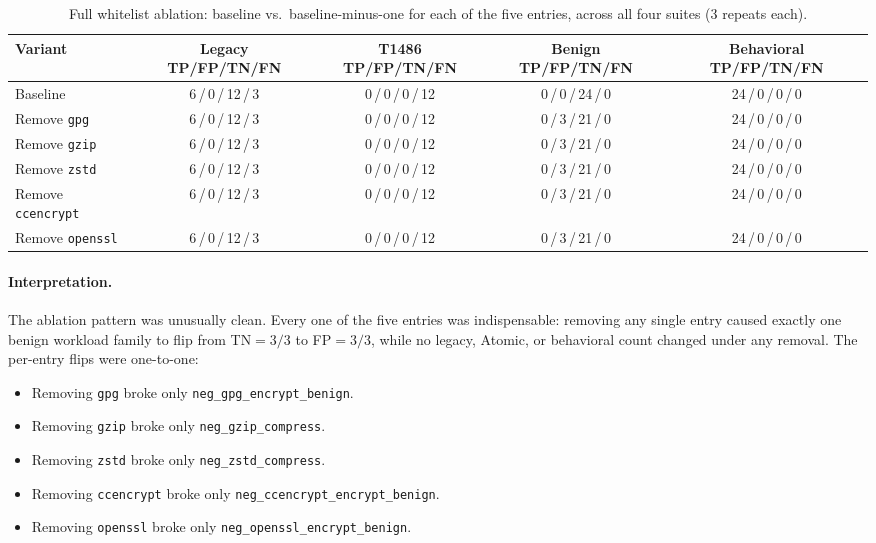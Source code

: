 \documentclass[twocolumn, 10pt]{scrartcl}
\begin{document}
\begin{table}[htbp]
    \centering
    \small
    \begin{tabular}{lcccc}
    \toprule
    \textbf{Variant} & \textbf{Legacy TP/FP/TN/FN} & \textbf{T1486 TP/FP/TN/FN} & \textbf{Benign TP/FP/TN/FN} & \textbf{Behavioral TP/FP/TN/FN} \\
    \midrule
    Baseline             & 6\,/\,0\,/\,12\,/\,3 & 0\,/\,0\,/\,0\,/\,12 & 0\,/\,0\,/\,24\,/\,0 & 24\,/\,0\,/\,0\,/\,0 \\
    Remove \texttt{gpg}       & 6\,/\,0\,/\,12\,/\,3 & 0\,/\,0\,/\,0\,/\,12 & 0\,/\,3\,/\,21\,/\,0 & 24\,/\,0\,/\,0\,/\,0 \\
    Remove \texttt{gzip}      & 6\,/\,0\,/\,12\,/\,3 & 0\,/\,0\,/\,0\,/\,12 & 0\,/\,3\,/\,21\,/\,0 & 24\,/\,0\,/\,0\,/\,0 \\
    Remove \texttt{zstd}      & 6\,/\,0\,/\,12\,/\,3 & 0\,/\,0\,/\,0\,/\,12 & 0\,/\,3\,/\,21\,/\,0 & 24\,/\,0\,/\,0\,/\,0 \\
    Remove \texttt{ccencrypt} & 6\,/\,0\,/\,12\,/\,3 & 0\,/\,0\,/\,0\,/\,12 & 0\,/\,3\,/\,21\,/\,0 & 24\,/\,0\,/\,0\,/\,0 \\
    Remove \texttt{openssl}   & 6\,/\,0\,/\,12\,/\,3 & 0\,/\,0\,/\,0\,/\,12 & 0\,/\,3\,/\,21\,/\,0 & 24\,/\,0\,/\,0\,/\,0 \\
    \bottomrule
    \end{tabular}
    \caption{Full whitelist ablation: baseline vs.\ baseline-minus-one for each of the five entries, across all four suites (3 repeats each).}
    \label{tab:ablation-full}
\end{table}

\paragraph{Interpretation.}
The ablation pattern was unusually clean. Every one of the five entries was
indispensable: removing any single entry caused exactly one benign workload
family to flip from TN$=3/3$ to FP$=3/3$, while no legacy, Atomic, or
behavioral count changed under any removal. The per-entry flips were
one-to-one:

\begin{itemize}
    \item Removing \texttt{gpg} broke only \texttt{neg\_gpg\_encrypt\_benign}.
    \item Removing \texttt{gzip} broke only \texttt{neg\_gzip\_compress}.
    \item Removing \texttt{zstd} broke only \texttt{neg\_zstd\_compress}.
    \item Removing \texttt{ccencrypt} broke only \texttt{neg\_ccencrypt\_encrypt\_benign}.
    \item Removing \texttt{openssl} broke only \texttt{neg\_openssl\_encrypt\_benign}.
\end{itemize}
\end{document}
